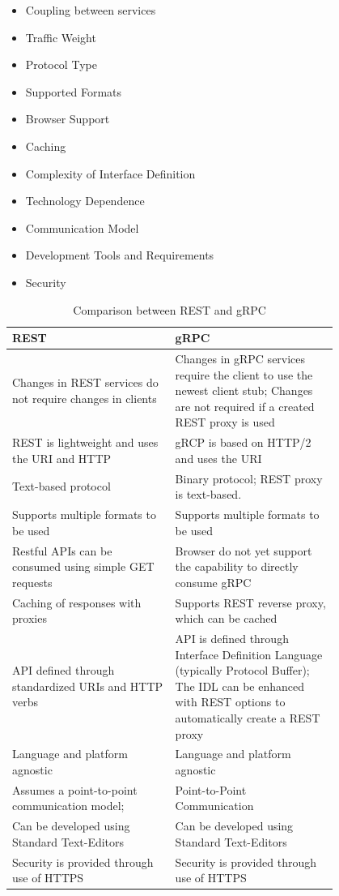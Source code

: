 \documentclass[conference]{IEEEtran}
\begin{document}
\begin{itemize}
	\item Coupling between services
	\item Traffic Weight
	\item Protocol Type
	\item Supported Formats
	\item Browser Support
	\item Caching
	\item Complexity of Interface Definition
	\item Technology Dependence
	\item Communication Model
	\item Development Tools and Requirements
	\item Security
\end{itemize}

\begin{table}[!htbp]
	\centering
	\caption{Comparison between REST and gRPC}
	\label{fig:compRestGrpc}
	\begin{tabular}{| p{0.4\linewidth} | p{0.4\linewidth}|}\hline
		REST & gRPC \\\hline
		Changes in REST services do not require changes in clients & Changes in gRPC services require the client to use the newest client stub; Changes are not required if a created REST proxy is used\\\hline
		REST is lightweight and uses the URI and HTTP & gRCP is based on HTTP/2 and uses the URI\\\hline
		Text-based protocol & Binary protocol; REST proxy is text-based.\\\hline
		Supports multiple formats to be used & Supports multiple formats to be used \\\hline
		Restful APIs can be consumed using simple GET requests & Browser do not yet support the capability to directly consume gRPC \\\hline
		Caching of responses with proxies & Supports REST reverse proxy, which can be cached\\\hline
		API defined through standardized URIs and HTTP verbs & API is defined through Interface Definition Language (typically Protocol Buffer); The IDL can be enhanced with REST options to automatically create a REST proxy \\\hline
		Language and platform agnostic & Language and platform agnostic\\\hline
		Assumes a point-to-point communication model; & Point-to-Point Communication\\\hline
		Can be developed using Standard Text-Editors & Can be developed using Standard Text-Editors\\\hline
		Security is provided through use of HTTPS & Security is provided through use of HTTPS\\\hline
	\end{tabular}
\end{table}
\end{document}
